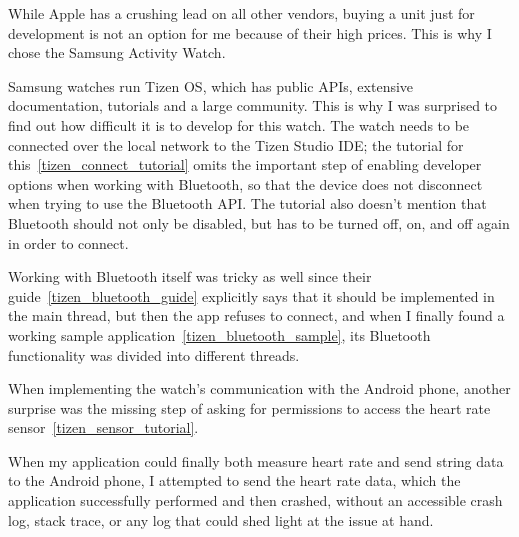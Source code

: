 While Apple has a crushing lead on all other vendors, buying a unit just for development is not an option for me because of their high prices.
This is why I chose the Samsung Activity Watch.

Samsung watches run Tizen OS, which has public APIs, extensive documentation, tutorials and a large community.
This is why I was surprised to find out how difficult it is to develop for this watch.
The watch needs to be connected over the local network to the Tizen Studio IDE; the tutorial for this~\ref{tizen_connect_tutorial} omits the important step of enabling developer options when working with Bluetooth, so that the device does not disconnect when trying to use the Bluetooth API.
The tutorial also doesn't mention that Bluetooth should not only be disabled, but has to be turned off, on, and off again in order to connect.

Working with Bluetooth itself was tricky as well since their guide~\ref{tizen_bluetooth_guide} explicitly says that it should be implemented in the main thread, but then the app refuses to connect, and when I finally found a working sample application~\ref{tizen_bluetooth_sample}, its Bluetooth functionality was divided into different threads.

When implementing the watch's communication with the Android phone, another surprise was the missing step of asking for permissions to access the heart rate sensor~\ref{tizen_sensor_tutorial}.

When my application could finally both measure heart rate and send string data to the Android phone, I attempted to send the heart rate data, which the application successfully performed and then crashed, without an accessible crash log, stack trace, or any log that could shed light at the issue at hand.


